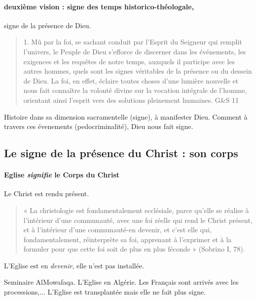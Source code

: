 \paragraph{deuxième vision : signe des temps historico-théologale,}
 signe de la présence de Dieu. 
\begin{quote}
    1. Mû par la foi, se sachant conduit par l’Esprit du Seigneur qui remplit l’univers, le Peuple de Dieu s’efforce de discerner dans les événements, les exigences et les requêtes de notre temps, auxquels il participe avec les autres hommes, quels sont les signes véritables de la présence ou du dessein de Dieu. La foi, en effet, éclaire toutes choses d’une lumière nouvelle et nous fait connaître la volonté divine sur la vocation intégrale de l’homme, orientant ainsi l’esprit vers des solutions pleinement humaines. G\&S 11
\end{quote}

Histoire dans sa dimension sacramentelle (signe), à manifester Dieu.  Comment à travers ces évenements (pedocriminalité), Dieu nous fait signe.


\subsection{Le signe de la présence du Christ : son corps}

\paragraph{Eglise \textit{signifie} le Corps du Christ} Le Christ est rendu présent.

\begin{quote}
    « La christologie est fondamentalement ecclésiale, parce qu’elle se réalise à l’intérieur d’une
communauté, avec une foi réelle qui rend le Christ présent, et à l’intérieur d’une communauté-en devenir,
et c’est elle qui, fondamentalement, réinterprète sa foi, apprenant à l’exprimer et à la formuler
pour que cette foi soit de plus en plus féconde » (Sobrino I, 78).
\end{quote}

L'Eglise est en \textit{devenir}, elle n'est pas installée. 

\begin{Ex}
    Seminaire AlMowafaqa. L'Eglise en Algérie. Les Français sont arrivés avec les processions,... L'Eglise est transplantée mais elle ne fait plus signe.
\end{Ex}

